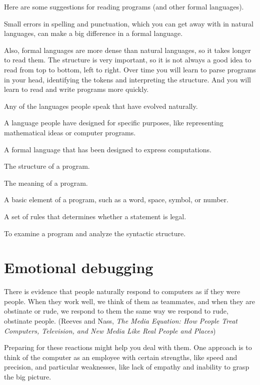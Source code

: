 Here are some suggestions for reading programs (and other formal languages).

Small errors in spelling and punctuation, which you can get away with in natural languages, can make a big difference in a formal language.

Also, formal languages are more dense than natural languages, so it takes longer to read them.
The structure is very important, so it is not always a good idea to read from top to bottom, left to right.
Over time you will learn to parse programs in your head, identifying the tokens and interpreting the structure.
And you will learn to read and write programs more quickly.


Any of the languages people speak that have evolved naturally.

A language people have designed for specific purposes, like representing mathematical ideas or computer programs.

A formal language that has been designed to express computations.

The structure of a program.

The meaning of a program.

A basic element of a program, such as a word, space, symbol, or number.

A set of rules that determines whether a statement is legal.

To examine a program and analyze the syntactic structure.


\section{Emotional debugging}


There is evidence that people naturally respond to computers as if they were people.
When they work well, we think of them as teammates, and when they are obstinate or rude, we respond to them the same way we respond to rude, obstinate people.
(Reeves and Nass, {\it The Media Equation: How People Treat Computers, Television, and New Media Like Real People and Places})

Preparing for these reactions might help you deal with them.
One approach is to think of the computer as an employee with certain strengths, like speed and precision, and particular weaknesses, like lack of empathy and inability to grasp the big picture.

